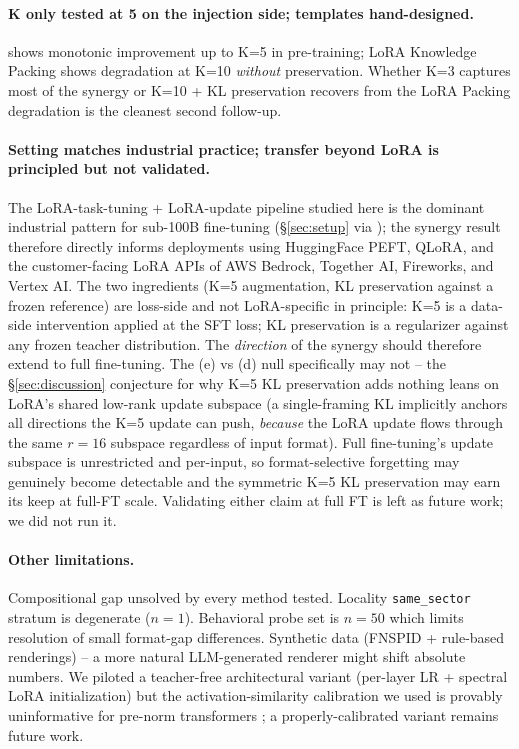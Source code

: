 \documentclass[11pt]{article}
\newcommand{\code}[1]{\texttt{\small #1}}
\begin{document}
\paragraph{K only tested at 5 on the injection side; templates hand-designed.}
\citet{allenzhu2023knowledge} shows monotonic improvement up to K=5 in
pre-training; LoRA Knowledge Packing \citep{pletenev2025lora} shows
degradation at K=10 \emph{without} preservation. Whether K=3 captures
most of the synergy or K=10 + KL preservation recovers from the LoRA
Packing degradation is the cleanest second follow-up.

\paragraph{Setting matches industrial practice; transfer beyond LoRA is principled but not validated.}
The LoRA-task-tuning + LoRA-update pipeline studied here is the dominant
industrial pattern for sub-100B fine-tuning (\S\ref{sec:setup} via
\citealp{hu2021lora, dettmers2023qlora, mangrulkar2022peft, han2024peft,
lialin2023scaling}); the synergy result therefore directly informs
deployments using HuggingFace PEFT, QLoRA, and the customer-facing LoRA
APIs of AWS Bedrock, Together AI, Fireworks, and Vertex AI. The two
ingredients (K=5 augmentation, KL preservation against a frozen reference)
are loss-side and not LoRA-specific in principle: K=5 is a data-side
intervention applied at the SFT loss; KL preservation is a regularizer
against any frozen teacher distribution. The \emph{direction} of the
synergy should therefore extend to full fine-tuning. The (e) vs (d) null
specifically may not -- the \S\ref{sec:discussion} conjecture for why K=5
KL preservation adds nothing leans on LoRA's shared low-rank update
subspace (a single-framing KL implicitly anchors all directions the K=5
update can push, \emph{because} the LoRA update flows through the same
$r=16$ subspace regardless of input format). Full fine-tuning's update
subspace is unrestricted and per-input, so format-selective forgetting may
genuinely become detectable and the symmetric K=5 KL preservation may earn
its keep at full-FT scale. Validating either claim at full FT is left as
future work; we did not run it.

\paragraph{Other limitations.}
Compositional gap unsolved by every method tested. Locality
\code{same\_sector} stratum is degenerate ($n=1$). Behavioral probe set is
$n=50$ which limits resolution of small format-gap differences. Synthetic
data (FNSPID + rule-based renderings) -- a more natural LLM-generated
renderer might shift absolute numbers. We piloted a teacher-free
architectural variant (per-layer LR + spectral LoRA initialization) but
the activation-similarity calibration we used is provably uninformative
for pre-norm transformers \citep{men2024shortgpt}; a properly-calibrated
variant remains future work.
\end{document}

